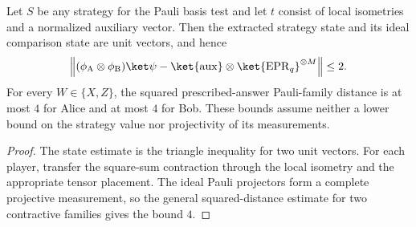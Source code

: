 \begin{theorem}
\label{thm:pauli-universal-distance-caps-support}
\leanok
{}
Let $S$ be any strategy for the Pauli basis test and let $t$ consist of local
isometries and a normalized auxiliary vector.  Then the extracted strategy
state and its ideal comparison state are unit vectors, and hence
\[
 \left\|(\phi_{\mathrm A}\otimes\phi_{\mathrm B})\ket\psi
   -\ket{\mathrm{aux}}\otimes\ket{\mathrm{EPR}_q}^{\otimes M}\right\|
 \leq2.
\]
For every $W\in\{X,Z\}$, the squared prescribed-answer Pauli-family distance
is at most $4$ for Alice and at most $4$ for Bob.  These bounds assume neither
a lower bound on the strategy value nor projectivity of its measurements.
\end{theorem}
\begin{proof}
\leanok
{}
The state estimate is the triangle inequality for two unit vectors.  For each
player, transfer the square-sum contraction through the local isometry and
the appropriate tensor placement.  The ideal Pauli projectors form a complete
projective measurement, so the general squared-distance estimate for two
contractive families gives the bound $4$.
\end{proof}

